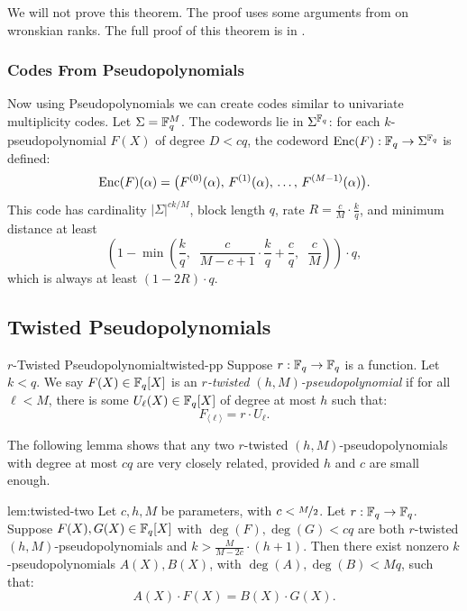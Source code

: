 We will not prove this theorem. The proof uses some arguments from \cite{Guruswami2014} on wronskian ranks. The full proof of this theorem is in \cite[Section 5.7]{Kopparty2026}.

\subsubsection{Codes From Pseudopolynomials}
Now using Pseudopolynomials we can create codes similar to univariate multiplicity codes.  Let $\Sigma = \mathbb{F}_q^M$. The codewords lie in $\Sigma^{\mathbb{F}_q}$: for each $k$-pseudopolynomial $F(X)$ of degree $D < cq$, the codeword $\operatorname{Enc}(F): \mathbb{F}_q \to \Sigma^{\mathbb{F}_q}$ is defined:
\[
  \operatorname{Enc}(F)(\alpha) = \bigl(F^{(0)}(\alpha),\, F^{(1)}(\alpha),\, \ldots,\, F^{(M-1)}(\alpha)\bigr).
\]
This code has cardinality $|\Sigma|^{ck/M}$, block length $q$, rate $R = \frac{c}{M}\cdot\frac{k}{q}$, and minimum distance at least
\[
  \left(1 - \min\!\left(\frac{k}{q},\;\; \frac{c}{M-c+1}\cdot\frac{k}{q} + \frac{c}{q},\;\; \frac{c}{M}\right)\right)\cdot q,
\]
which is always at least $(1 - 2R)\cdot q$.

\subsection{Twisted Pseudopolynomials}\label{subsec:twisted-pp}

\begin{Definition}{$r$-Twisted Pseudopolynomial}{twisted-pp}
  Suppose $r : \mathbb{F}_q \to \mathbb{F}_q$ is a function. Let $k < q$. We say $F(X) \in \mathbb{F}_q[X]$ is an \emph{$r$-twisted $(h, M)$-pseudopolynomial} if for all $\ell < M$, there is some $U_\ell(X) \in \mathbb{F}_q[X]$ of degree at most $h$ such that:
  \[
    F_{\langle\ell\rangle} = r \cdot U_\ell.
  \]
\end{Definition}

The following lemma shows that any two $r$-twisted $(h, M)$-pseudopolynomials with degree at most $cq$ are very closely related, provided $h$ and $c$ are small enough.

\begin{lemma}{}{lem:twisted-two}
  Let $c, h, M$ be parameters, with $c < \nicefrac{M}2$. Let $r : \mathbb{F}_q \to \mathbb{F}_q$. Suppose $F(X), G(X) \in \mathbb{F}_q[X]$ with $\deg(F), \deg(G) < cq$ are both $r$-twisted $(h, M)$-pseudopolynomials and $k > \frac{M}{M - 2c} \cdot (h + 1)$. Then there exist nonzero $k$-pseudopolynomials $A(X), B(X)$, with $\deg(A), \deg(B) < Mq$, such that:
  \[
    A(X) \cdot F(X) = B(X) \cdot G(X).
  \]
\end{lemma}

